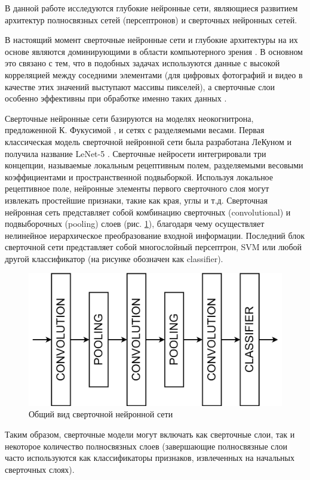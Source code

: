 В данной работе исследуются глубокие нейронные сети, являющиеся развитием архитектур полносвязных сетей (персептронов) и сверточных нейронных сетей.

В настоящий момент сверточные нейронные сети и глубокие архитектуры на их основе являются доминирующими в области компьютерного зрения \cite{LeCun2015}. В основном это связано с тем, что в подобных задачах используются данные с высокой корреляцией между соседними элементами (для цифровых фотографий и видео в качестве этих значений выступают массивы пикселей), а сверточные слои особенно эффективны при обработке именно таких данных \cite{Emmert2020}.

Сверточные нейронные сети базируются на моделях неокогнитрона, предложенной К. Фукусимой \cite{fukushima1980}, и сетях с разделяемыми весами. Первая классическая модель сверточной нейронной сети была разработана ЛеКуном и получила название LeNet-5 \cite{lekun1998}. Сверточные нейросети интегрировали три концепции, называемые локальным рецептивным полем, разделяемыми весовыми коэффициентами и пространственной подвыборкой. Используя локальное рецептивное поле, нейронные элементы первого сверточного слоя могут извлекать простейшие признаки, такие как края, углы и т.д. Сверточная нейронная сеть представляет собой комбинацию сверточных (convolutional) и подвыборочных (pooling) слоев (рис. \ref{fig:cnn_common_view}), благодаря чему осуществляет нелинейное иерархическое преобразование входной информации. Последний блок сверточной сети представляет собой многослойный персептрон, SVM или любой другой классификатор (на рисунке обозначен как classifier).

\begin{figure}[ht]
	\centering
	\includegraphics[width=14cm]{man-source/images/ch4/pic4-15.png}
	\caption{Общий вид сверточной нейронной сети}
	\label{fig:cnn_common_view}
\end{figure}
Таким образом, сверточные модели могут включать как сверточные слои, так и некоторое количество полносвязных слоев (завершающие полносвязные слои часто используются как классификаторы признаков, извлеченных на начальных сверточных слоях). %


